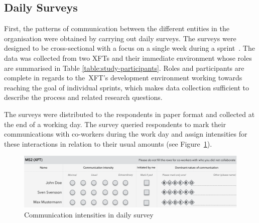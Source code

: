 
\subsection{Daily Surveys}

First, the patterns of communication between the different entities in the organisation were obtained by carrying out daily surveys. The surveys were designed to be cross-sectional with a focus on a single week during a sprint~\citep{pinsonneault1993}. The data was collected from two \acp{XFT} and their immediate environment whose roles are summarised in Table \ref{table:study-participants}. Roles and participants are complete in regards to the~\ac{XFT}'s development environment working towards reaching the goal of individual sprints, which makes data collection sufficient to describe the process and related research questions.

The surveys were distributed to the respondents in paper format and collected at the end of a working day.  
The survey queried respondents to mark their communications with co-workers during the work day and assign intensities for these interactions in relation to their usual amounts (see Figure~\ref{fig:survey-intenity}).  

\begin{figure}[h!]
  \centering
  \includegraphics[width=1.0\textwidth]{figures/fake-partial-intensity.png}
  \caption{Communication intensities in daily survey}
  \label{fig:survey-intenity}
\end{figure}

